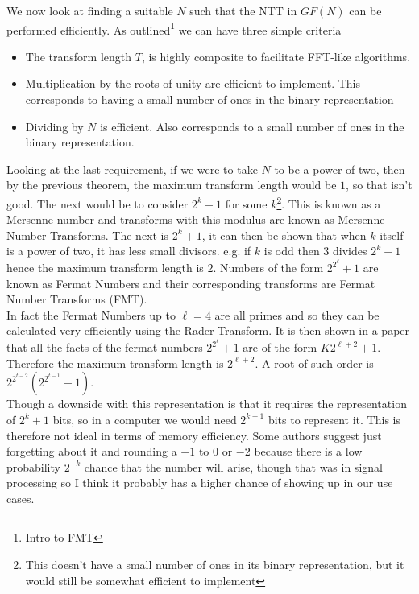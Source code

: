 We now look at finding a suitable $N$ such that the NTT in $GF(N)$ can be performed efficiently. As outlined\footnote{Intro to FMT} we can have three simple criteria
\begin{itemize}
\item The transform length $T$, is highly composite to facilitate FFT-like algorithms.
\item Multiplication by the roots of unity are efficient to implement. This corresponds to having a small number of ones in the binary representation
\item Dividing by $N$ is efficient. Also corresponds to a small number of ones in the binary representation.
\end{itemize}

Looking at the last requirement, if we were to take $N$ to be a power of two, then by the previous theorem, the maximum transform length would be $1$, so that isn't good. The next would be to consider $2^k - 1$ for some $k$\footnote{This doesn't have a small number of ones in its binary representation, but it would still be somewhat efficient to implement}. This is known as a Mersenne number and transforms with this modulus are known as Mersenne Number Transforms. The next is $2^k + 1$, it can then be shown that when $k$ itself is a power of two, it has less small divisors. e.g. if $k$ is odd then $3$ divides $2^k + 1$ hence the maximum transform length is $2$. Numbers of the form $2^{2^\ell} + 1$ are known as Fermat Numbers and their corresponding transforms are Fermat Number Transforms (FMT).\\

In fact the Fermat Numbers up to $\ell = 4$ are all primes and so they can be calculated very efficiently using the Rader Transform.
It is then shown in a paper that all the facts of the fermat numbers $2^{2^\ell} + 1$ are of the form $K2^{\ell + 2} + 1$. Therefore the maximum transform length is $2^{\ell + 2}$. A root of such order is $2^{2^{t-2}}(2^{2^{t-1}} - 1)$.\\

Though a downside with this representation is that it requires the representation of $2^k + 1$ bits, so in a computer we would need $2^{k+1}$ bits to represent it. This is therefore not ideal in terms of memory efficiency. Some authors suggest just forgetting about it and rounding a $-1$ to $0$ or $-2$ because there is a low probability $2^{-k}$ chance that the number will arise, though that was in signal processing so I think it probably has a higher chance of showing up in our use cases.\\


